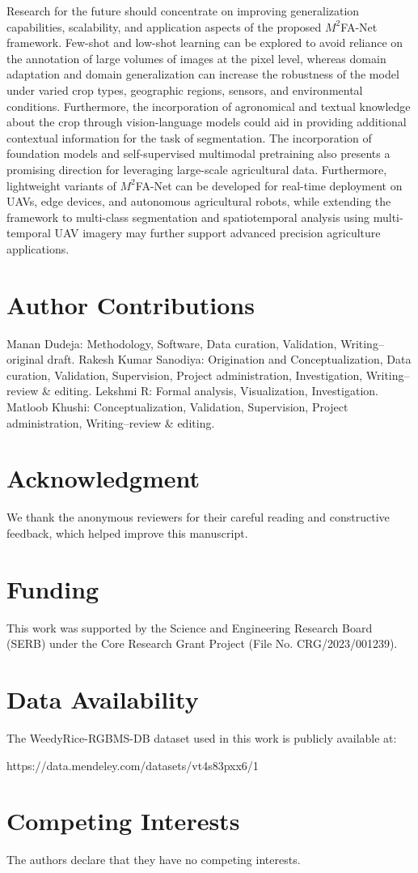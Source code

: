 \documentclass[pdflatex,sn-mathphys-num]{sn-jnl}
\begin{document}
Research for the future should concentrate on improving
generalization capabilities, scalability, and application aspects of the proposed $M^2$FA-Net framework. Few-shot and low-shot learning can be explored to avoid reliance on the annotation of large volumes of images at the pixel level, whereas
domain adaptation and domain generalization can increase the robustness of the model under varied crop types, geographic regions, sensors, and environmental conditions. Furthermore, the incorporation of agronomical and textual knowledge about the crop through vision-language models could aid in providing additional contextual information for the task of segmentation. The incorporation of foundation models and self-supervised multimodal pretraining also presents a promising direction for leveraging large-scale agricultural data. Furthermore, lightweight variants of $M^2$FA-Net can be developed for real-time deployment on UAVs, edge devices, and autonomous agricultural robots, while extending the framework to multi-class segmentation and spatiotemporal analysis using multi-temporal UAV imagery may further support advanced precision agriculture applications.
\section*{Author Contributions}

Manan Dudeja: Methodology, Software, Data curation, Validation, Writing--original draft.
Rakesh Kumar Sanodiya: Origination and Conceptualization, Data curation, Validation, Supervision, Project administration, Investigation, Writing--review \& editing.
Lekshmi R: Formal analysis, Visualization, Investigation.
Matloob Khushi: Conceptualization, Validation, Supervision, Project administration, Writing--review \& editing.

\section*{Acknowledgment}
We thank the anonymous reviewers for their careful reading and constructive feedback, which helped improve this manuscript.

\section*{Funding}
This work was supported by the
Science and Engineering Research Board (SERB)
under the Core Research Grant Project (File No. 
CRG/2023/001239). 

\section*{Data Availability}

The WeedyRice-RGBMS-DB dataset used in this work is publicly available at: 

https://data.mendeley.com/datasets/vt4s83pxx6/1

\section*{Competing Interests}

The authors declare that they have no competing interests.



\end{document}
